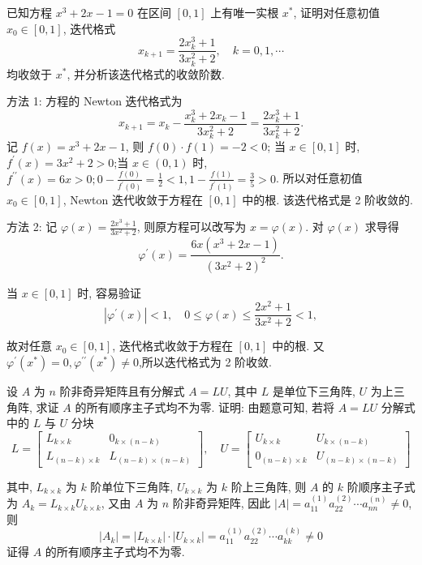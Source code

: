  \begin{tcolorbox}[enhanced,colback=green!10!white,colframe=green!50!white,breakable,coltitle=green!25!black,title=2024]

已知方程 $ x^{3}+2 x-1=0 $ 在区间 $ [0,1] $ 上有唯一实根 $ x^{*} $, 证明对任意初值 $ x_{0} \in[0,1] $, 迭代格式
$$
x_{k+1}=\frac{2 x_{k}^{3}+1}{3 x_{k}^{2}+2}, \quad k=0,1, \cdots
$$
均收敛于 $ x^{*} $, 并分析该迭代格式的收敛阶数.

 \tcblower
 方法 1: 方程的 Newton 迭代格式为
$$
x_{k+1}=x_{k}-\frac{x_{k}^{3}+2 x_{k}-1}{3 x_{k}^{2}+2}=\frac{2 x_{k}^{3}+1}{3 x_{k}^{2}+2} .
$$
记 $ f(x)=x^{3}+2 x-1 $, 则 $ f(0) \cdot f(1)=-2<0 $; 当 $ x \in[0,1] $ 时, $ f^{\prime}(x)=3 x^{2}+2>0 $;当 $ x \in(0,1) $ 时, $ f^{\prime \prime}(x)=6 x>0 ; 0-\frac{f(0)}{f^{\prime}(0)}=\frac{1}{2}<1,1-\frac{f(1)}{f^{\prime}(1)}=\frac{3}{5}>0 $. 所以对任意初值 $ x_{0} \in[0,1] $, Newton 迭代收敛于方程在 $ [0,1] $ 中的根. 该迭代格式是 2 阶收敛的.

方法 2: 记 $ \varphi(x)=\frac{2 x^{3}+1}{3 x^{2}+2} $, 则原方程可以改写为 $ x=\varphi(x) $. 对 $ \varphi(x) $ 求导得
$$
\varphi^{\prime}(x)=\frac{6 x\left(x^{3}+2 x-1\right)}{\left(3 x^{2}+2\right)^{2}} .
$$

当 $ x \in[0,1] $ 时, 容易验证
$$
\left|\varphi^{\prime}(x)\right|<1, \quad 0 \leqslant \varphi(x) \leqslant \frac{2 x^{2}+1}{3 x^{2}+2}<1,
$$

故对任意 $ x_{0} \in[0,1] $, 迭代格式收敛于方程在 $ [0,1] $ 中的根. 又 $ \varphi^{\prime}\left(x^{*}\right)=0, \varphi^{\prime \prime}\left(x^{*}\right) \neq 0 $,所以迭代格式为 2 阶收敛.
 \end{tcolorbox}


     \begin{tcolorbox}[enhanced,colback=blue!8!white,colframe=blue!25!white,breakable,title=2024]

 设 $ A $ 为 $ n $ 阶非奇异矩阵且有分解式 $ A=L U $, 其中 $ L $ 是单位下三角阵, $ U $ 为上三角阵, 求证 $ A $ 的所有顺序主子式均不为零.
 \tcblower
证明: 由题意可知, 若将 $ A=L U $ 分解式中的 $ L $ 与 $ U $ 分块
$$
L=\left[\begin{array}{cc}
L_{k \times k} & 0_{k \times(n-k)} \\
L_{(n-k) \times k} & L_{(n-k) \times(n-k)}
\end{array}\right], \quad U=\left[\begin{array}{cc}
U_{k \times k} & U_{k \times(n-k)} \\
0_{(n-k) \times k} & U_{(n-k) \times(n-k)}
\end{array}\right]
$$

其中, $ L_{k \times k} $ 为 $ k $ 阶单位下三角阵, $ U_{k \times k} $ 为 $ k $ 阶上三角阵, 则 $ A $ 的 $ k $ 阶顺序主子式为 $ A_{k}=L_{k \times k} U_{k \times k} $, 又由 $ A $ 为 $ n $ 阶非奇异矩阵, 因此 $ |A|=a_{11}^{(1)} a_{22}^{(2)} \cdots a_{n n}^{(n)} \neq 0 $,则
$$
\left|A_{k}\right|=\left|L_{k \times k}\right| \cdot\left|U_{k \times k}\right|=a_{11}^{(1)} a_{22}^{(2)} \cdots a_{k k}^{(k)} \neq 0
$$
证得 $ A $ 的所有顺序主子式均不为零.

 \end{tcolorbox}

